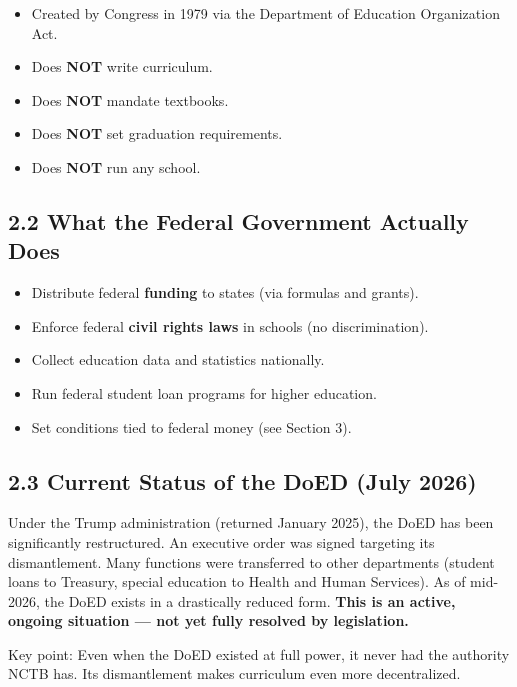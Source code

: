 	\begin{itemize}
		\item Created by Congress in 1979 via the Department of Education Organization Act.
		\item Does \textbf{NOT} write curriculum.
		\item Does \textbf{NOT} mandate textbooks.
		\item Does \textbf{NOT} set graduation requirements.
		\item Does \textbf{NOT} run any school.
	\end{itemize}

	\subsection{2.2 What the Federal Government Actually Does}

	\begin{itemize}
		\item Distribute federal \textbf{funding} to states (via formulas and grants).
		\item Enforce federal \textbf{civil rights laws} in schools (\eg no discrimination).
		\item Collect education data and statistics nationally.
		\item Run federal student loan programs for higher education.
		\item Set conditions tied to federal money (see Section 3).
	\end{itemize}

	\subsection{2.3 Current Status of the DoED (July 2026)}

	Under the Trump administration (returned January 2025), the DoED has been significantly restructured. An executive order was signed targeting its dismantlement. Many functions were transferred to other departments (\eg student loans to Treasury, special education to Health and Human Services). As of mid-2026, the DoED exists in a drastically reduced form. \textbf{This is an active, ongoing situation --- not yet fully resolved by legislation.}

	Key point: Even when the DoED existed at full power, it never had the authority NCTB has. Its dismantlement makes curriculum even more decentralized.


